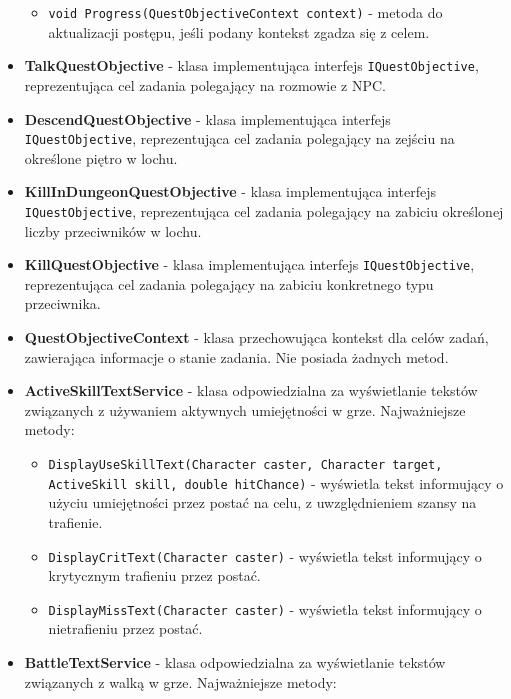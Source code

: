 \begin{itemize}
\begin{itemize}
                    \item \texttt{void Progress(QuestObjectiveContext context)} - metoda do aktualizacji postępu, jeśli podany kontekst zgadza się z celem.
                \end{itemize}
            \item \textbf{TalkQuestObjective} - klasa implementująca interfejs \texttt{IQuestObjective}, reprezentująca cel zadania polegający na rozmowie z NPC.
            \item \textbf{DescendQuestObjective} - klasa implementująca interfejs \texttt{IQuestObjective}, reprezentująca cel zadania polegający na zejściu na określone piętro w lochu.
            \item \textbf{KillInDungeonQuestObjective} - klasa implementująca interfejs \texttt{IQuestObjective}, reprezentująca cel zadania polegający na zabiciu określonej liczby przeciwników w lochu.
            \item \textbf{KillQuestObjective} - klasa implementująca interfejs \texttt{IQuestObjective}, reprezentująca cel zadania polegający na zabiciu konkretnego typu przeciwnika.
            \item \textbf{QuestObjectiveContext} - klasa przechowująca kontekst dla celów zadań, zawierająca informacje o stanie zadania. Nie posiada żadnych metod.
            \item \textbf{ActiveSkillTextService} - klasa odpowiedzialna za wyświetlanie tekstów związanych z używaniem aktywnych umiejętności w grze. 
            Najważniejsze metody:
                \begin{itemize}
                    \item \texttt{DisplayUseSkillText(Character caster, Character target, ActiveSkill skill, double hitChance)} - wyświetla tekst 
                    informujący o użyciu umiejętności przez postać na celu, z uwzględnieniem szansy na trafienie.
                    \item \texttt{DisplayCritText(Character caster)} - wyświetla tekst informujący o krytycznym trafieniu przez postać.
                    \item \texttt{DisplayMissText(Character caster)} - wyświetla tekst informujący o nietrafieniu przez postać.
                \end{itemize}
            \item \textbf{BattleTextService} - klasa odpowiedzialna za wyświetlanie tekstów związanych z walką w grze. 
            Najważniejsze metody:
                \begin{itemize}

\end{itemize}
\end{itemize}
